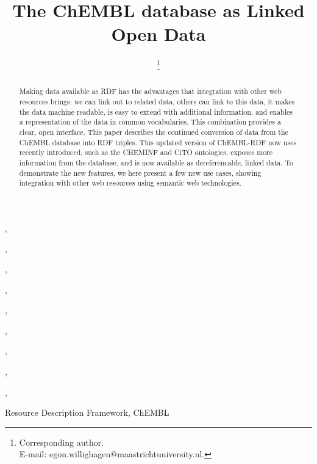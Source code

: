 \documentclass[sw]{iosart2c}
\begin{document}
\newcommand{\url}[1]{#1}

\begin{frontmatter}

\title{The ChEMBL database as Linked Open Data}



\author[A]{ \thanks{Corresponding author.\\ E-mail: egon.willighagen@maastrichtuniversity.nl.}}
\author[A]{ }
\author[B]{ },
\author[C]{ },
\author[D]{ },
\author[D]{ },
\author[E]{ },
\author[F]{ },
\author[F]{ },
\author[F]{ },
\author[G]{ },
\author[G]{ }

\address[A]{Department of Bioinformatics - BiGCaT, Maastricht University, ADDRESS, Maastricht,\\ The Netherlands}
\address[B]{Department of Pharmaceutical Biosciences, Uppsala University, PO Box 591, SE-751 24, Uppsala, Sweden}
\address[C]{University of Queensland}
\address[D]{Royal Society of Chemistry, 904 Tamaras Circle, Wake Forest, NC 27587, U.S.A.}
\address[E]{ChEBI, European Bioinformatics Institute}
\address[F]{ChEMBL, European Bioinformatics Institute}
\address[G]{Indiana University}

\begin{abstract}
Making data available as RDF has the advantages that integration with other web resources brings:
we can link out to related data, others can link to this data, it makes the data machine readable,
is easy to extend with additional information,  and enables a representation of the data in common
vocabularies. This combination provides a clear, open interface.
This paper describes the continued conversion of data from the ChEMBL database into RDF triples.
This updated version of ChEMBL-RDF now uses recently introduced, such as the CHEMINF and CiTO ontologies,
exposes more information from the database, and is now available as dereferencable, linked data.
To demonstrate the new features, we here present a few new use cases, showing integration with
other web resources using semantic web technologies.
\end{abstract}

\begin{keyword}
Resource Description Framework, ChEMBL
\end{keyword}

\end{frontmatter}
\end{document}

